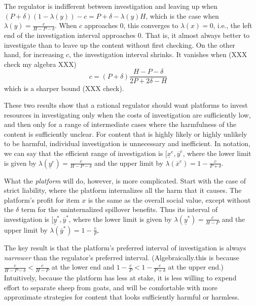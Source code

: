 The regulator is indifferent between investigation and leaving up when $(P + \delta)(1 - \lambda(y)) - c = P + \delta - \lambda(y)H$, which is the case when $\lambda(y) = \frac{c}{H - P - \delta}$. When $c$ approaches $0$, this converges to $\lambda(x) = 0$, i.e., the left end of the investigation interval approaches $0$. That is, it almost always better to investigate than to leave up the content without first checking. On the other hand, for increasing $c$, the investigation interval shrinks. It vanishes when (XXX check my algebra XXX)
\begin{equation}
c = (P + \delta)\frac{H - P - \delta}{2P + 2\delta - H}
\end{equation} 
which is a sharper bound (XXX check).

These two results show that a rational regulator should want platforms to invest resources in investigating only when the costs of investigation are sufficiently low, and then only for a range of intermediate cases where the harmfulness of the content is sufficiently unclear. For content that is highly likely or highly unlikely to be harmful, individual investigation is unnecessary and inefficient. In notation, we can say that the efficient range of investigation is $[\underline{x}^e, \overline{y}^e$, where the lower limit  is given by $\lambda(\underline{y}^e) = \frac{c}{H - P - \delta} $ and the upper limit by $\lambda(\overline{x}^e) = 1 - \frac{c}{P + \delta}$.

What the \emph{platform} will do, however, is more complicated. Start with the case of strict liability, where the platform internalizes all the harm that it causes. The platform's profit for item $x$ is the same as the overall social value, except without the $\delta$ term for the uninternalized spillover benefits. Thus its interval of investigation is $[\underline{y}^*, \overline{y}^*$, where the lower limit  is given by $\lambda(\underline{y}^*) = \frac{c}{H - P} $ and the upper limit by $\lambda(\overline{y}^*) = 1 - \frac{c}{P}$.

The key result is that the platform's preferred interval of investigation is always \emph{narrower} than the regulator's preferred interval. (Algebraically.this is because  $\frac{c}{H - P - \delta} < \frac{c}{H - P}$ at the lower end and $1 - \frac{c}{P} < 1 - \frac{c}{P + \delta}$ at the upper end.) Intuitively, because the platform has less at stake, it is less willing to expend effort to separate sheep from goats, and will be comfortable with more approximate strategies for content that looks sufficiently harmful or harmless.
